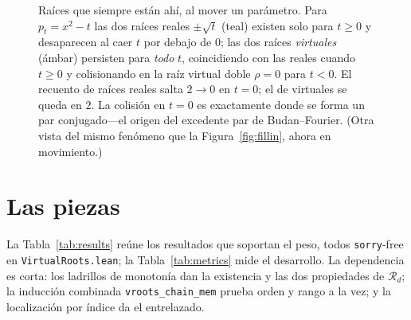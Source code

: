\documentclass[11pt]{article}
\newcommand{\lean}[1]{\texttt{#1}}
\newcommand{\Rd}{\mathcal{R}}
\begin{document}
\begin{figure}[H]
\centering
{}
\caption{Ra\'ices que siempre est\'an ah\'i, al mover un par\'ametro. Para $p_t=x^2-t$ las dos ra\'ices
reales $\pm\sqrt{t}$ (teal) existen solo para $t\ge 0$ y desaparecen al caer $t$ por debajo de $0$; las
dos ra\'ices \emph{virtuales} (\'ambar) persisten para \emph{todo} $t$, coincidiendo con las reales
cuando $t\ge 0$ y colisionando en la ra\'iz virtual doble $\rho=0$ para $t<0$. El recuento de ra\'ices
reales salta $2\to 0$ en $t=0$; el de virtuales se queda en $2$. La colisi\'on en $t=0$ es exactamente
donde se forma un par conjugado---el origen del excedente par de Budan--Fourier. (Otra vista del mismo
fen\'omeno que la Figura~\ref{fig:fillin}, ahora en movimiento.)}
\label{fig:bifurc}
\end{figure}

\section{Las piezas}\label{sec:blocks}

La Tabla~\ref{tab:results} re\'une los resultados que soportan el peso, todos \lean{sorry}-free en
\lean{VirtualRoots.lean}; la Tabla~\ref{tab:metrics} mide el desarrollo. La dependencia es corta: los
ladrillos de monoton\'ia dan la existencia y las dos propiedades de $\Rd_d$; la inducci\'on combinada
\lean{vroots\_chain\_mem} prueba orden y rango a la vez; y la localizaci\'on por \'indice da el
entrelazado.
\end{document}

